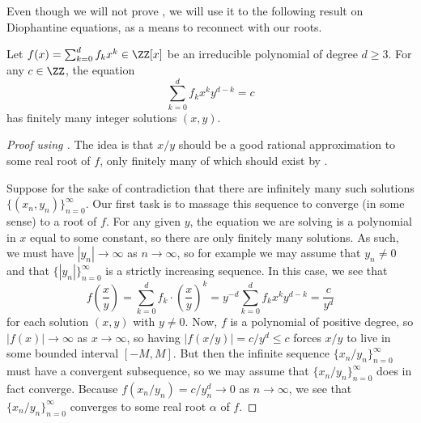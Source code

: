 \documentclass[../notes.tex]{subfiles}
\begin{document}
Even though we will not prove , we will use it to the following result on Diophantine equations, as a means to reconnect with our roots.
\begin{theorem}[Thue] \label{thm:dio-thue}
	Let $f(x)=\sum_{k=0}^df_kx^k\in\ZZ[x]$ be an irreducible polynomial of degree $d\ge3$. For any $c\in\ZZ$, the equation
	\[\sum_{k=0}^df_kx^ky^{d-k}=c\]
	has finitely many integer solutions $(x,y)$.
\end{theorem}
\begin{proof}[Proof using ]
	The idea is that $x/y$ should be a good rational approximation to some real root of $f$, only finitely many of which should exist by .

	Suppose for the sake of contradiction that there are infinitely many such solutions $\{(x_n,y_n)\}_{n=0}^\infty$. Our first task is to massage this sequence to converge (in some sense) to a root of $f$. For any given $y$, the equation we are solving is a polynomial in $x$ equal to some constant, so there are only finitely many solutions. As such, we must have $\left|y_n\right|\to\infty$ as $n\to\infty$, so for example we may assume that $y_n\ne0$ and that $\{\left|y_n\right|\}_{n=0}^\infty$ is a strictly increasing sequence. In this case, we see that
	\[f\left(\frac xy\right)=\sum_{k=0}^df_k\cdot\left(\frac xy\right)^k=y^{-d}\sum_{k=0}^df_kx^ky^{d-k}=\frac c{y^d}\]
	for each solution $(x,y)$ with $y\ne0$. Now, $f$ is a polynomial of positive degree, so $\left|f(x)\right|\to\infty$ as $x\to\infty$, so having $\left|f(x/y)\right|=c/y^d\le c$ forces $x/y$ to live in some bounded interval $[-M,M]$. But then the infinite sequence $\{x_n/y_n\}_{n=0}^\infty$ must have a convergent subsequence, so we may assume that $\{x_n/y_n\}_{n=0}^\infty$ does in fact converge. Because $f(x_n/y_n)=c/y_n^d\to0$ as $n\to\infty$, we see that $\{x_n/y_n\}_{n=0}^\infty$ converges to some real root $\alpha$ of $f$.


\end{proof}
\end{document}
